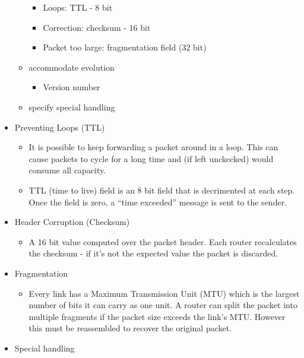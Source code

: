 \documentclass[]{article}
\providecommand{\tightlist}{%
  \setlength{\itemsep}{0pt}\setlength{\parskip}{0pt}}
\begin{document}
\begin{itemize}
\begin{itemize}
    \begin{itemize}
    \tightlist
    \item
      Loops: TTL - 8 bit
    \item
      Correction: checksum - 16 bit
    \item
      Packet too large: fragmentation field (32 bit)
    \end{itemize}
  \item
    accommodate evolution

    \begin{itemize}
    \tightlist
    \item
      Version number
    \end{itemize}
  \item
    specify special handling
  \end{itemize}
\item
  Preventing Loops (TTL)

  \begin{itemize}
  \tightlist
  \item
    It is possible to keep forwarding a packet around in a loop. This
    can cause packets to cycle for a long time and (if left unckecked)
    would consume all capacity.
  \item
    TTL (time to live) field is an 8 bit field that is decrimented at
    each step. Once the field is zero, a ``time exceeded'' message is
    sent to the sender.
  \end{itemize}
\item
  Header Corruption (Checksum)

  \begin{itemize}
  \tightlist
  \item
    A 16 bit value computed over the packet header. Each router
    recalculates the checksum - if it's not the expected value the
    packet is discarded.
  \end{itemize}
\item
  Fragmentation

  \begin{itemize}
  \tightlist
  \item
    Every link has a Maximum Transmission Unit (MTU) which is the
    largest number of bits it can carry as one unit. A router can split
    the packet into multiple fragments if the packet size exceeds the
    link's MTU. However this must be reassembled to recover the original
    packet.
  \end{itemize}
\item
  Special handling


\end{itemize}
\end{document}
